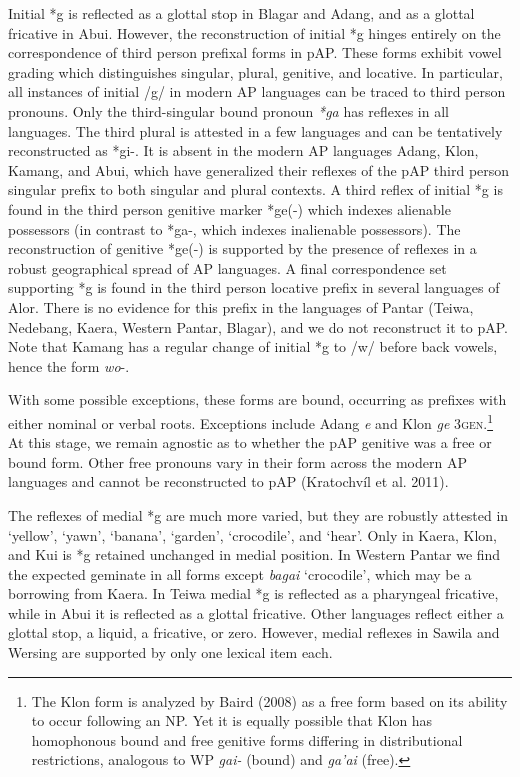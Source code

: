 Initial *g is reflected as a glottal stop in Blagar and Adang, and as a glottal fricative in Abui. However, the reconstruction of initial *g hinges entirely on the correspondence of third person prefixal forms in pAP. These forms exhibit vowel grading which distinguishes singular, plural, genitive, and locative. In particular, all instances of initial /g/ in modern AP languages can be traced to third person pronouns. Only the third-singular bound pronoun \textit{*ga }has reflexes in all languages. The third plural is attested in a few languages and can be tentatively reconstructed as *gi-. It is absent in the modern AP languages Adang, Klon, Kamang, and Abui, which have generalized their reflexes of the pAP third person singular prefix to both singular and plural contexts. A third reflex of initial *g is found in the third person genitive marker *ge(-) which indexes alienable possessors (in contrast to *ga-, which indexes inalienable possessors). The reconstruction of genitive *ge(-) is supported by the 
presence of reflexes in a robust geographical spread of AP languages. A final correspondence set supporting *g is found in the third person locative prefix in several languages of Alor. There is no evidence for this prefix in the languages of Pantar (Teiwa, Nedebang, Kaera, Western Pantar, Blagar), and we do not reconstruct it to pAP. Note that Kamang has a regular change of initial *g to /w/ before back vowels, hence the form \textit{wo}{}-.

With some possible exceptions, these forms are bound, occurring as prefixes with either nominal or verbal roots. Exceptions include Adang \textit{{\textglotstop}}\textit{e} and Klon \textit{ge} 3\textsc{gen.}\footnote{ The Klon form is analyzed by Baird (2008) as a free form based on its ability to occur following an NP. Yet it is equally possible that Klon has homophonous bound and free genitive forms differing in distributional restrictions, analogous to WP \textit{gai-} (bound) and \textit{ga{\textquoteright}ai} (free).} At this stage, we remain agnostic as to whether the pAP genitive was a free or bound form. Other free pronouns vary in their form across the modern AP languages and cannot be reconstructed to pAP (Kratochv\'il et al. 2011). 

The reflexes of medial *g are much more varied, but they are robustly attested in {\textquoteleft}yellow{\textquoteright}, {\textquoteleft}yawn{\textquoteright}, {\textquoteleft}banana{\textquoteright}, {\textquoteleft}garden{\textquoteright}, {\textquoteleft}crocodile{\textquoteright}, and {\textquoteleft}hear{\textquoteright}. Only in Kaera, Klon, and Kui is *g retained unchanged in medial position. In Western Pantar we find the expected geminate in all forms except \textit{bagai} {\textquoteleft}crocodile{\textquoteright}, which may be a borrowing from Kaera. In Teiwa medial *g is reflected as a pharyngeal fricative, while in Abui it is reflected as a glottal fricative. Other languages reflect either a glottal stop, a liquid, a fricative, or zero. However, medial reflexes in Sawila and Wersing are supported by only one lexical item each. 

